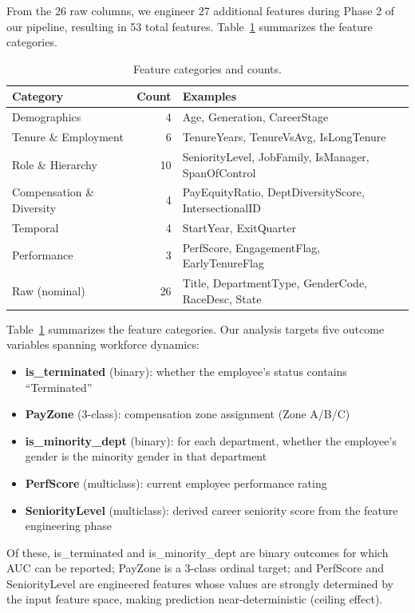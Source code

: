 \documentclass[twocolumn]{article}
\begin{document}
From the 26 raw columns, we engineer 27 additional features during Phase 2 of our pipeline, resulting in 53 total features. Table~\ref{tab:features} summarizes the feature categories.

\begin{table}[ht]
\centering
\caption{Feature categories and counts.}
\label{tab:features}
\begin{tabular}{lrp{4.5cm}}
\hline
Category & Count & Examples \\
\hline
Demographics & 4 & Age, Generation, CareerStage \\
Tenure \& Employment & 6 & TenureYears, TenureVsAvg, IsLongTenure \\
Role \& Hierarchy & 10 & SeniorityLevel, JobFamily, IsManager, SpanOfControl \\
Compensation \& Diversity & 4 & PayEquityRatio, DeptDiversityScore, IntersectionalID \\
Temporal & 4 & StartYear, ExitQuarter \\
Performance & 3 & PerfScore, EngagementFlag, EarlyTenureFlag \\
Raw (nominal) & 26 & Title, DepartmentType, GenderCode, RaceDesc, State \\
\hline
\end{tabular}
\end{table}

Table~\ref{tab:features} summarizes the feature categories. Our analysis targets five outcome variables spanning workforce dynamics:

\begin{itemize}
    \item \textbf{is\_terminated} (binary): whether the employee's status contains ``Terminated''
    \item \textbf{PayZone} (3-class): compensation zone assignment (Zone A/B/C)
    \item \textbf{is\_minority\_dept} (binary): for each department, whether the employee's gender is the minority gender in that department
    \item \textbf{PerfScore} (multiclass): current employee performance rating
    \item \textbf{SeniorityLevel} (multiclass): derived career seniority score from the feature engineering phase
\end{itemize}

Of these, is\_terminated and is\_minority\_dept are binary outcomes for which AUC can be reported; PayZone is a 3-class ordinal target; and PerfScore and SeniorityLevel are engineered features whose values are strongly determined by the input feature space, making prediction near-deterministic (ceiling effect).
\end{document}
